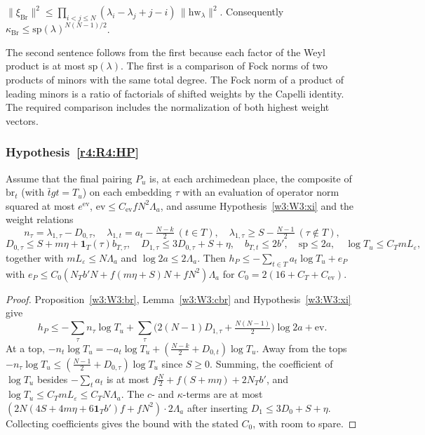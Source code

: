 \begin{hypothesis}\label{w3:W3:xi}
$\lVert\xi_{\mathrm{Br}}\rVert^2\le\prod_{i<j\le N}(\lambda_i-\lambda_j+j-i)\,\lVert\mathrm{hw}_\lambda\rVert^2$. Consequently $\kappa_{\mathrm{Br}}\le\mathrm{sp}(\lambda)^{N(N-1)/2}$.
\end{hypothesis}

The second sentence follows from the first because each factor of the Weyl product is at most $\mathrm{sp}(\lambda)$. The first is a comparison of Fock norms of two products of minors with the same total degree. The Fock norm of a product of leading minors is a ratio of factorials of shifted weights by the Capelli identity. The required comparison includes the normalization of both highest weight vectors. 

\subsubsection{Hypothesis~\ref{r4:R4:HP}}

\begin{theorem}\label{w3:W3:HP}
Assume that the final pairing $P_u$ is, at each archimedean place, the composite of $\mathrm{br}_t$ (with $\bar tgt=T_u$) on each embedding $\tau$ with an evaluation of operator norm squared at most $e^{\mathrm{ev}}$, $\mathrm{ev}\le C_{\mathrm{ev}}fN^2\Lambda_a$, and assume Hypothesis~\ref{w3:W3:xi} and the weight relations
\[
n_\tau=\lambda_{1,\tau}-D_{0,\tau},\quad\lambda_{1,t}=a_t-\tfrac{N-k}2\ (t\in T),\quad\lambda_{1,\tau}\ge S-\tfrac{N-1}2\ (\tau\notin T),
\]
\[
D_{0,\tau}\le S+m\eta+\mathbf 1_T(\tau)b_{T,\tau},\quad D_{1,\tau}\le3D_{0,\tau}+S+\eta,\quad b_{T,t}\le2b',\quad\mathrm{sp}\le2a,\quad\log T_u\le C_TmL_\varepsilon,
\]
together with $mL_\varepsilon\le N\Lambda_a$ and $\log2a\le2\Lambda_a$. Then $h_P\le-\sum_{t\in T}a_t\log T_u+e_P$ with $e_P\le C_0(N_Tb'N+f(m\eta+S)N+fN^2)\Lambda_a$ for $C_0=2(16+C_T+C_{\mathrm{ev}})$.
\end{theorem}

\begin{proof}
Proposition~\ref{w3:W3:br}, Lemma~\ref{w3:W3:cbr} and Hypothesis~\ref{w3:W3:xi} give
\[
h_P\le-\sum_\tau n_\tau\log T_u+\sum_\tau\big(2(N-1)D_{1,\tau}+\tfrac{N(N-1)}2\big)\log2a+\mathrm{ev}.
\]
At a top, $-n_t\log T_u=-a_t\log T_u+(\frac{N-k}2+D_{0,t})\log T_u$. Away from the tops $-n_\tau\log T_u\le(\frac{N-1}2+D_{0,\tau})\log T_u$ since $S\ge0$. Summing, the coefficient of $\log T_u$ besides $-\sum_ta_t$ is at most $f\frac N2+f(S+m\eta)+2N_Tb'$, and $\log T_u\le C_TmL_\varepsilon\le C_TN\Lambda_a$. The $c$- and $\kappa$-terms are at most $(2N(4S+4m\eta+6\mathbf 1_Tb')f+fN^2)\cdot2\Lambda_a$ after inserting $D_1\le3D_0+S+\eta$. Collecting coefficients gives the bound with the stated $C_0$, with room to spare.
\end{proof}

